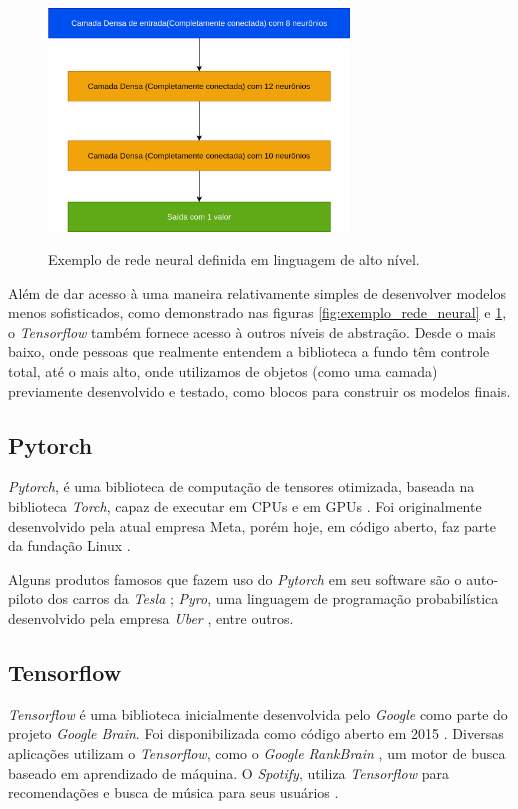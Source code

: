 \begin{figure}[H]
    \centering
    \caption{Exemplo de rede neural definida em linguagem de alto nível.}
    \includegraphics[width=8cm]{fig/sample_nn.png}
    \label{fig:exemplo_rede_neural_diagrama_alto_nivel}
\end{figure}

Além de dar acesso à uma maneira relativamente simples de desenvolver modelos menos sofisticados, como demonstrado nas figuras \ref{fig:exemplo_rede_neural} e \ref{fig:exemplo_rede_neural_diagrama_alto_nivel}, o \textit{Tensorflow} também fornece acesso à outros níveis de abstração. Desde o mais baixo, onde pessoas que realmente entendem a biblioteca a fundo têm controle total, até o mais alto, onde utilizamos de objetos (como uma camada) previamente desenvolvido e testado, como blocos para construir os modelos finais.

\subsection{Pytorch}
\label{pytorch}

\textit{Pytorch}, é uma biblioteca de computação de tensores otimizada, baseada na biblioteca \textit{Torch}, capaz de executar em CPUs e em GPUs \cite{pytorch_pytorch_2023}. Foi originalmente desenvolvido pela atual empresa Meta, porém hoje, em código aberto, faz parte da fundação Linux \cite{zemlin_welcoming_nodate}. 

Alguns produtos famosos que fazem uso do \textit{Pytorch} em seu software são o auto-piloto dos carros da \textit{Tesla} \cite{karpathy_pytorch_2019}; \textit{Pyro}, uma linguagem de programação probabilística desenvolvido pela empresa \textit{Uber} \cite{goodman_uber_2017}, entre outros.

\subsection{Tensorflow}
\label{tensorflow}

\textit{Tensorflow} é uma biblioteca inicialmente desenvolvida pelo \textit{Google} como parte do projeto \textit{Google Brain}. Foi disponibilizada como código aberto em 2015 \cite{jeff_tensorflow_2015, abadi_tensorflow_2015}. Diversas aplicações utilizam o \textit{Tensorflow}, como o \textit{Google RankBrain} \cite{davies_complete_2020}, um motor de busca baseado em aprendizado de máquina. O \textit{Spotify}, utiliza \textit{Tensorflow} para recomendações e busca de música para seus usuários \cite{ngahane_winding_2019}.
